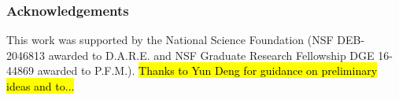 \documentclass[11pt]{article}
\begin{document}
\subsubsection{Acknowledgements}
This work was supported by the National Science Foundation 
(NSF DEB-2046813 awarded to D.A.R.E. and NSF Graduate Research Fellowship DGE 16-44869 awarded 
to P.F.M.). \hl{Thanks to Yun Deng for guidance on preliminary ideas and to...}









\end{document}
